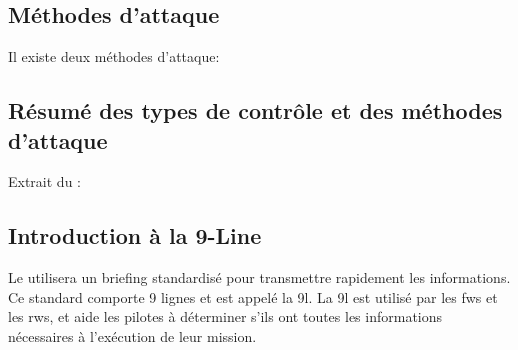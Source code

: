 \subsection{Méthodes d'attaque}
\e
    \item
    Il existe deux méthodes d'attaque:
    \ee
        \vskip5mm
    \ed
\ed

\subsection{Résumé des types de contrôle et des méthodes d'attaque}
\e
    \item
    Extrait du \jp: \\
    \vskip2mm
\ed

\subsection{Introduction à la 9-Line}

Le \ja{} utilisera un briefing standardisé pour transmettre rapidement les informations. Ce standard comporte 9 lignes et est appelé la \gls{9l}. La \gls{9l} est utilisé par les \glspl{fw} et les \glspl{rw}, et aide les pilotes à déterminer s'ils ont toutes les informations nécessaires à l'exécution de leur mission.


